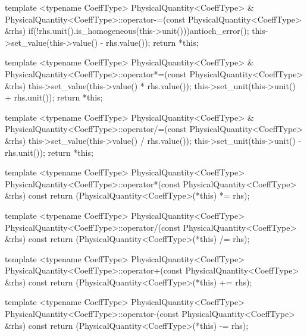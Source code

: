 \begin{cpp}[\tiny]
{  template <typename CoeffType>
  PhysicalQuantity<CoeffType> & 
        PhysicalQuantity<CoeffType>::operator-=(const PhysicalQuantity<CoeffType> &rhs)
  {
     if(!rhs.unit().is_homogeneous(this->unit()))antioch_error();
     this->set_value(this->value() - rhs.value());
     return *this;
  }

  template <typename CoeffType>
  PhysicalQuantity<CoeffType> & 
        PhysicalQuantity<CoeffType>::operator*=(const PhysicalQuantity<CoeffType> &rhs)
  {
     this->set_value(this->value() * rhs.value());
     this->set_unit(this->unit() + rhs.unit());
     return *this;
  }

  template <typename CoeffType>
  PhysicalQuantity<CoeffType> &
        PhysicalQuantity<CoeffType>::operator/=(const PhysicalQuantity<CoeffType> &rhs)
  {
     this->set_value(this->value() / rhs.value());
     this->set_unit(this->unit() - rhs.unit());
     return *this;
  }

  template <typename CoeffType>
  PhysicalQuantity<CoeffType>
        PhysicalQuantity<CoeffType>::operator*(const PhysicalQuantity<CoeffType> &rhs) const
  {
     return (PhysicalQuantity<CoeffType>(*this) *= rhs);
  }

  template <typename CoeffType>
  PhysicalQuantity<CoeffType>
        PhysicalQuantity<CoeffType>::operator/(const PhysicalQuantity<CoeffType> &rhs) const
  {
     return (PhysicalQuantity<CoeffType>(*this) /= rhs);
  }

  template <typename CoeffType>
  PhysicalQuantity<CoeffType>
        PhysicalQuantity<CoeffType>::operator+(const PhysicalQuantity<CoeffType> &rhs) const
  {
     return (PhysicalQuantity<CoeffType>(*this) += rhs);
  }
  
  template <typename CoeffType>
  PhysicalQuantity<CoeffType>
        PhysicalQuantity<CoeffType>::operator-(const PhysicalQuantity<CoeffType> &rhs) const
  {
     return (PhysicalQuantity<CoeffType>(*this) -= rhs);
  }

}
\end{cpp}
